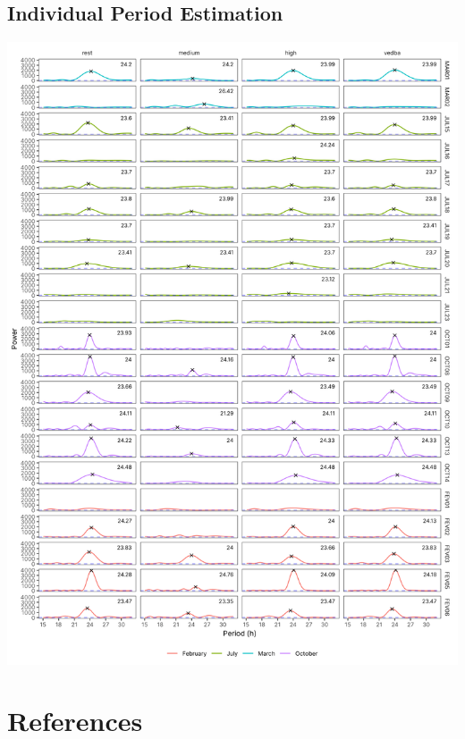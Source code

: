 \documentclass[english,msc,numbers,hidelinks]{coppe}
\begin{document}
  \hypertarget{individual-period-estimation}{%
  \section{Individual Period Estimation}\label{individual-period-estimation}}
  \begin{center}\includegraphics[width=1\linewidth]{../04_figures/periodogram/periodogram} \end{center}

  \backmatter
  
  

  \hypertarget{references}{%
  \chapter*{References}\label{references}}

  \noindent
\end{document}
